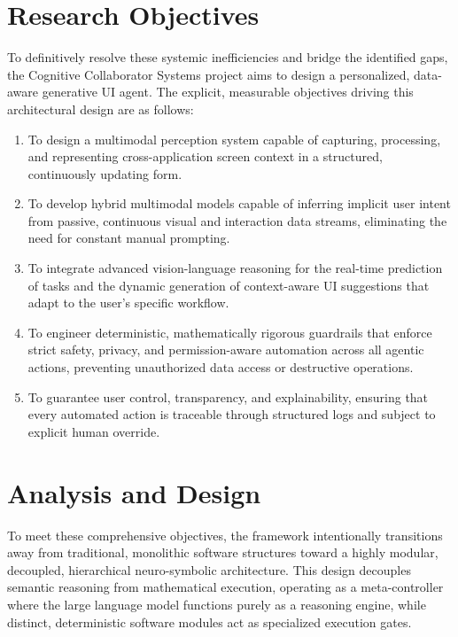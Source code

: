 \documentclass[12pt, a4paper]{report}
\begin{document}
\section{Research Objectives}
To definitively resolve these systemic inefficiencies and bridge the identified gaps, the Cognitive Collaborator Systems project aims to design a personalized, data-aware generative UI agent. The explicit, measurable objectives driving this architectural design are as follows:

\begin{enumerate}
    \item To design a multimodal perception system capable of capturing, processing, and representing cross-application screen context in a structured, continuously updating form.\cite{hojo2025}
    \item To develop hybrid multimodal models capable of inferring implicit user intent from passive, continuous visual and interaction data streams, eliminating the need for constant manual prompting.\cite{hojo2025}
    \item To integrate advanced vision-language reasoning for the real-time prediction of tasks and the dynamic generation of context-aware UI suggestions that adapt to the user's specific workflow.\cite{hojo2025}
    \item To engineer deterministic, mathematically rigorous guardrails that enforce strict safety, privacy, and permission-aware automation across all agentic actions, preventing unauthorized data access or destructive operations.\cite{hojo2025}
    \item To guarantee user control, transparency, and explainability, ensuring that every automated action is traceable through structured logs and subject to explicit human override.\cite{hojo2025}
\end{enumerate}

\section{Analysis and Design}
To meet these comprehensive objectives, the framework intentionally transitions away from traditional, monolithic software structures toward a highly modular, decoupled, hierarchical neuro-symbolic architecture. This design decouples semantic reasoning from mathematical execution, operating as a meta-controller where the large language model functions purely as a reasoning engine, while distinct, deterministic software modules act as specialized execution gates.
\end{document}

